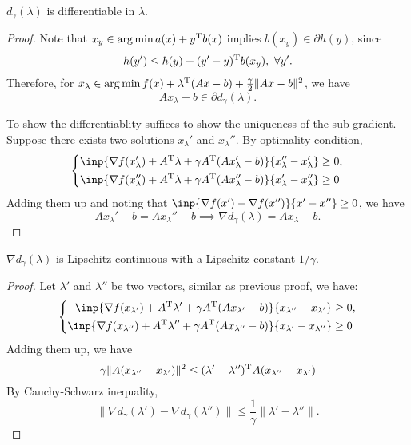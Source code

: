 \begin{proposition}[Smooth]
$d_\gamma(\lambda)$ is differentiable in $\lambda$.
\end{proposition}
\begin{proof}
Note that $x_y\in \arg\min a(x)+y^{\mathrm T} b(x)$ implies $b(x_y)\in\partial h(y)$, since 
\[
h(y')\le h(y)+(y'-y)\trans b(x_y),\ \forall y'.
\]
Therefore, for $x_\lambda\in\arg\min f(x)+\lambda^{\mathrm T}(Ax-b)+\frac{\gamma}{2}\|Ax-b\|^2$, we have
\[
Ax_\lambda-b\in\partial d_\gamma(\lambda).
\]

To show the differentiablity suffices to show the uniqueness of the sub-gradient. Suppose there exists two solutions $x_\lambda'$ and $x_\lambda''$. By optimality condition,
\[
\left\{
\begin{aligned}
\inp{\nabla f(x_\lambda')+A\trans\lambda + \gamma A\trans(Ax'_\lambda-b)}{x_\lambda''-x_\lambda'}&\ge0,\\
\inp{\nabla f(x_\lambda'')+A\trans\lambda + \gamma A\trans(Ax''_\lambda-b)}{x_\lambda'-x_\lambda''}&\ge0
\end{aligned}
\right.
\]
Adding them up and noting that $\inp{\nabla f(x')-\nabla f(x'')}{x'-x''}\ge0$, we have
\[
Ax_\lambda'-b=Ax_{\lambda}''-b\implies \nabla d_\gamma(\lambda) = Ax_\lambda-b.
\]
\end{proof}

\begin{proposition}
$\nabla d_\gamma(\lambda)$ is Lipschitz continuous with a Lipschitz constant $1/\gamma$.
\end{proposition}
\begin{proof}
Let $\lambda'$ and $\lambda''$ be two vectors, similar as previous proof, we have:
\[
\left\{
\begin{aligned}
\inp{\nabla f(x_{\lambda'})+A\trans\lambda' + \gamma A\trans(Ax_{\lambda'}-b)}{x_{\lambda''}-x_{\lambda'}}&\ge0,\\
\inp{\nabla f(x_{\lambda''})+A\trans\lambda'' + \gamma A\trans(Ax_{\lambda''}-b)}{x_{\lambda'}-x_{\lambda''}}&\ge0
\end{aligned}
\right.
\]
Adding them up, we have
\[
\gamma\|A(x_{\lambda''}-x_{\lambda'})\|^2\le(\lambda'-\lambda'')^{\mathrm T} A(x_{\lambda''}-x_{\lambda'})
\]
By Cauchy-Schwarz inequality,
\[
\|\nabla d_{\gamma}(\lambda') - \nabla d_\gamma(\lambda'')\|\le\frac{1}{\gamma}\|\lambda'-\lambda''\|.
\]
\end{proof}















